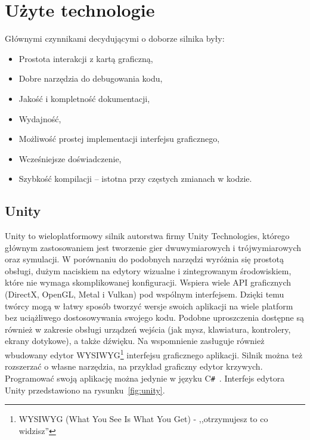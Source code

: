 \chapter*{Użyte technologie}
Głównymi czynnikami decydującymi o doborze silnika były:
\begin{itemize}
	\item Prostota interakcji z kartą graficzną,
	\item Dobre narzędzia do debugowania kodu,
	\item Jakość i kompletność dokumentacji,
	\item Wydajność,
	\item Możliwość prostej implementacji interfejsu graficznego,
	\item Wcześniejsze doświadczenie,
	\item Szybkość kompilacji -- istotna przy częstych zmianach w kodzie.
\end{itemize}
\section*{Unity}
Unity to wieloplatformowy silnik autorstwa firmy Unity Technologies, którego głównym zastosowaniem jest tworzenie gier dwuwymiarowych i trójwymiarowych oraz symulacji. W porównaniu do podobnych narzędzi wyróżnia się prostotą obsługi, dużym naciskiem na edytory wizualne i zintegrowanym środowiskiem, które nie wymaga skomplikowanej konfiguracji. Wspiera wiele API graficznych (DirectX, OpenGL, Metal i Vulkan)\cite{UnityManualGraphicsApiSupport} pod wspólnym interfejsem. Dzięki temu twórcy mogą w łatwy sposób tworzyć wersje swoich aplikacji na wiele platform bez uciążliwego dostosowywania swojego kodu. Podobne uproszczenia dostępne są również w zakresie obsługi urządzeń wejścia (jak mysz, klawiatura, kontrolery, ekrany dotykowe), a także dźwięku. Na wspomnienie zasługuje również wbudowany edytor WYSIWYG\footnote{WYSIWYG (What You See Is What You Get) - ,,otrzymujesz to co widzisz''} interfejsu graficznego aplikacji. Silnik można też rozszerzać o własne narzędzia, na przykład graficzny edytor krzywych. Programować swoją aplikację można jedynie w języku C\texttt{\#}~\cite{ProgramminginUnity}. Interfejs edytora Unity przedstawiono na rysunku~\ref{fig:unity}.
